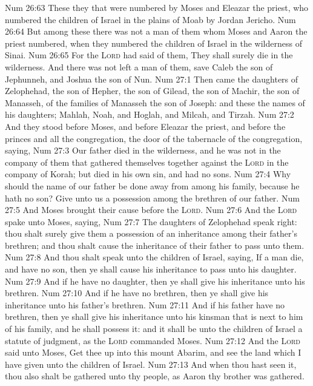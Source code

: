 \vs Num 26:63 These  they that were numbered by Moses and Eleazar the priest, who numbered the children of Israel in the plains of Moab by Jordan  Jericho.
\vs Num 26:64 But among these there was not a man of them whom Moses and Aaron the priest numbered, when they numbered the children of Israel in the wilderness of Sinai.
\vs Num 26:65 For the \textsc{Lord} had said of them, They shall surely die in the wilderness. And there was not left a man of them, save Caleb the son of Jephunneh, and Joshua the son of Nun.
\vs Num 27:1 Then came the daughters of Zelophehad, the son of Hepher, the son of Gilead, the son of Machir, the son of Manasseh, of the families of Manasseh the son of Joseph: and these  the names of his daughters; Mahlah, Noah, and Hoglah, and Milcah, and Tirzah.
\vs Num 27:2 And they stood before Moses, and before Eleazar the priest, and before the princes and all the congregation,  the door of the tabernacle of the congregation, saying,
\vs Num 27:3 Our father died in the wilderness, and he was not in the company of them that gathered themselves together against the \textsc{Lord} in the company of Korah; but died in his own sin, and had no sons.
\vs Num 27:4 Why should the name of our father be done away from among his family, because he hath no son? Give unto us  a possession among the brethren of our father.
\vs Num 27:5 And Moses brought their cause before the \textsc{Lord}.
\vs Num 27:6 And the \textsc{Lord} spake unto Moses, saying,
\vs Num 27:7 The daughters of Zelophehad speak right: thou shalt surely give them a possession of an inheritance among their father's brethren; and thou shalt cause the inheritance of their father to pass unto them.
\vs Num 27:8 And thou shalt speak unto the children of Israel, saying, If a man die, and have no son, then ye shall cause his inheritance to pass unto his daughter.
\vs Num 27:9 And if he have no daughter, then ye shall give his inheritance unto his brethren.
\vs Num 27:10 And if he have no brethren, then ye shall give his inheritance unto his father's brethren.
\vs Num 27:11 And if his father have no brethren, then ye shall give his inheritance unto his kinsman that is next to him of his family, and he shall possess it: and it shall be unto the children of Israel a statute of judgment, as the \textsc{Lord} commanded Moses.
\vs Num 27:12 And the \textsc{Lord} said unto Moses, Get thee up into this mount Abarim, and see the land which I have given unto the children of Israel.
\vs Num 27:13 And when thou hast seen it, thou also shalt be gathered unto thy people, as Aaron thy brother was gathered.
